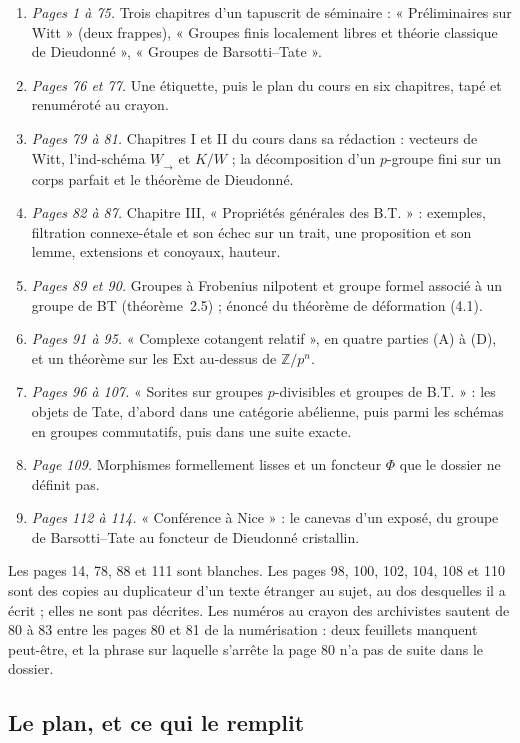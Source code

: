 \documentclass[11pt,a4paper]{article}
\begin{document}
\begin{enumerate}
  \item \emph{Pages 1 à 75.} Trois chapitres d'un tapuscrit de séminaire :
  « Préliminaires sur Witt » (deux frappes), « Groupes finis localement
  libres et théorie classique de Dieudonné », « Groupes de Barsotti–Tate ».
  \item \emph{Pages 76 et 77.} Une étiquette, puis le plan du cours en six
  chapitres, tapé et renuméroté au crayon.
  \item \emph{Pages 79 à 81.} Chapitres I et II du cours dans sa rédaction
  : vecteurs de Witt, l'ind-schéma $\underline{W}_{\to}$ et
  $K/W$ ; la décomposition d'un $p$-groupe fini sur un corps parfait et le
  théorème de Dieudonné.
  \item \emph{Pages 82 à 87.} Chapitre III, « Propriétés générales des
  B.T. » : exemples, filtration connexe-étale et son échec sur un trait,
  une proposition et son lemme, extensions et conoyaux, hauteur.
  \item \emph{Pages 89 et 90.} Groupes à Frobenius nilpotent et groupe
  formel associé à un groupe de BT (théorème~2.5) ; énoncé du théorème de
  déformation (4.1).
  \item \emph{Pages 91 à 95.} « Complexe cotangent relatif », en quatre
  parties (A) à (D), et un théorème sur les $\mathrm{Ext}$ au-dessus de
  $\mathbb{Z}/p^{n}$.
  \item \emph{Pages 96 à 107.} « Sorites sur groupes $p$-divisibles et
  groupes de B.T. » : les objets de Tate, d'abord dans une catégorie
  abélienne, puis parmi les schémas en groupes commutatifs, puis dans une
  suite exacte.
  \item \emph{Page 109.} Morphismes formellement lisses et un foncteur
  $\Phi$ que le dossier ne définit pas.
  \item \emph{Pages 112 à 114.} « Conférence à Nice » : le canevas d'un
  exposé, du groupe de Barsotti–Tate au foncteur de Dieudonné cristallin.
\end{enumerate}

Les pages 14, 78, 88 et 111 sont blanches. Les pages 98, 100, 102, 104, 108
et 110 sont des copies au duplicateur d'un texte étranger au sujet, au dos
desquelles il a écrit ; elles ne sont pas décrites. Les numéros au crayon
des archivistes sautent de 80 à 83 entre les pages 80 et 81 de la
numérisation : deux feuillets manquent peut-être, et la phrase sur laquelle
s'arrête la page 80 n'a pas de suite dans le dossier.

\subsection*{Le plan, et ce qui le remplit}
\end{document}
